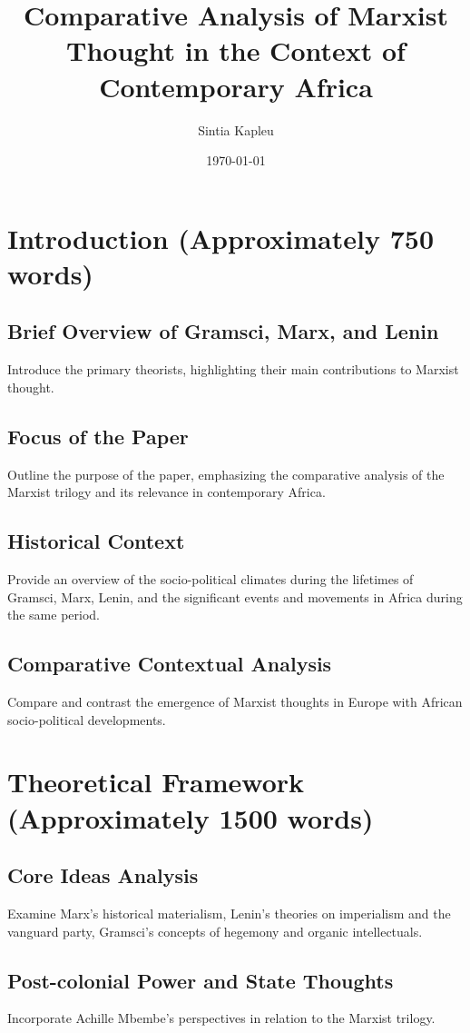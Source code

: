 \documentclass[12pt]{article}
\title{Comparative Analysis of Marxist Thought in the Context of Contemporary Africa}
\author{Sintia Kapleu}
\date{\today}
\begin{document}
\maketitle

\section{Introduction (Approximately 750 words)}
\subsection*{Brief Overview of Gramsci, Marx, and Lenin}
Introduce the primary theorists, highlighting their main contributions to Marxist thought.

\subsection*{Focus of the Paper}
Outline the purpose of the paper, emphasizing the comparative analysis of the Marxist trilogy and its relevance in contemporary Africa.

\subsection*{Historical Context}
Provide an overview of the socio-political climates during the lifetimes of Gramsci, Marx, Lenin, and the significant events and movements in Africa during the same period.

\subsection*{Comparative Contextual Analysis}
Compare and contrast the emergence of Marxist thoughts in Europe with African socio-political developments.

\section{Theoretical Framework (Approximately 1500 words)}
\subsection*{Core Ideas Analysis}
Examine Marx's historical materialism, Lenin's theories on imperialism and the vanguard party, Gramsci's concepts of hegemony and organic intellectuals.

\subsection*{Post-colonial Power and State Thoughts}
Incorporate Achille Mbembe's perspectives in relation to the Marxist trilogy.
\end{document}
